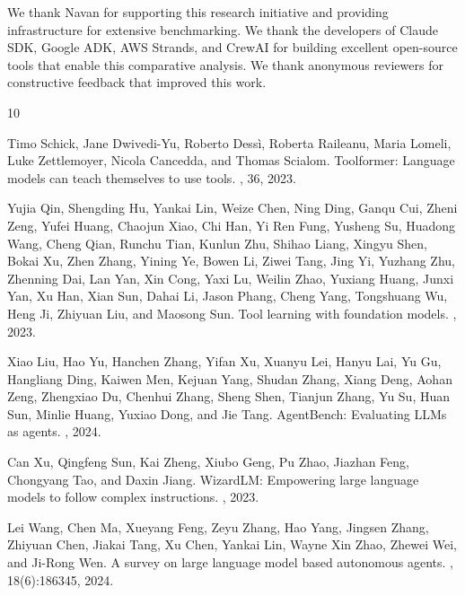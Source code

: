 \documentclass[sigconf,nonacm]{acmart}
\begin{document}
We thank Navan for supporting this research initiative and providing infrastructure for extensive benchmarking. We thank the developers of Claude SDK, Google ADK, AWS Strands, and CrewAI for building excellent open-source tools that enable this comparative analysis. We thank anonymous reviewers for constructive feedback that improved this work.


\begin{thebibliography}{10}

Timo Schick, Jane Dwivedi-Yu, Roberto Dessì, Roberta Raileanu, Maria Lomeli, Luke Zettlemoyer, Nicola Cancedda, and Thomas Scialom.
\newblock Toolformer: Language models can teach themselves to use tools.
, 36, 2023.

Yujia Qin, Shengding Hu, Yankai Lin, Weize Chen, Ning Ding, Ganqu Cui, Zheni Zeng, Yufei Huang, Chaojun Xiao, Chi Han, Yi Ren Fung, Yusheng Su, Huadong Wang, Cheng Qian, Runchu Tian, Kunlun Zhu, Shihao Liang, Xingyu Shen, Bokai Xu, Zhen Zhang, Yining Ye, Bowen Li, Ziwei Tang, Jing Yi, Yuzhang Zhu, Zhenning Dai, Lan Yan, Xin Cong, Yaxi Lu, Weilin Zhao, Yuxiang Huang, Junxi Yan, Xu Han, Xian Sun, Dahai Li, Jason Phang, Cheng Yang, Tongshuang Wu, Heng Ji, Zhiyuan Liu, and Maosong Sun.
\newblock Tool learning with foundation models.
, 2023.

Xiao Liu, Hao Yu, Hanchen Zhang, Yifan Xu, Xuanyu Lei, Hanyu Lai, Yu Gu, Hangliang Ding, Kaiwen Men, Kejuan Yang, Shudan Zhang, Xiang Deng, Aohan Zeng, Zhengxiao Du, Chenhui Zhang, Sheng Shen, Tianjun Zhang, Yu Su, Huan Sun, Minlie Huang, Yuxiao Dong, and Jie Tang.
\newblock AgentBench: Evaluating LLMs as agents.
, 2024.

Can Xu, Qingfeng Sun, Kai Zheng, Xiubo Geng, Pu Zhao, Jiazhan Feng, Chongyang Tao, and Daxin Jiang.
\newblock WizardLM: Empowering large language models to follow complex instructions.
, 2023.

Lei Wang, Chen Ma, Xueyang Feng, Zeyu Zhang, Hao Yang, Jingsen Zhang, Zhiyuan Chen, Jiakai Tang, Xu Chen, Yankai Lin, Wayne Xin Zhao, Zhewei Wei, and Ji-Rong Wen.
\newblock A survey on large language model based autonomous agents.
, 18(6):186345, 2024.


\end{thebibliography}
\end{document}
